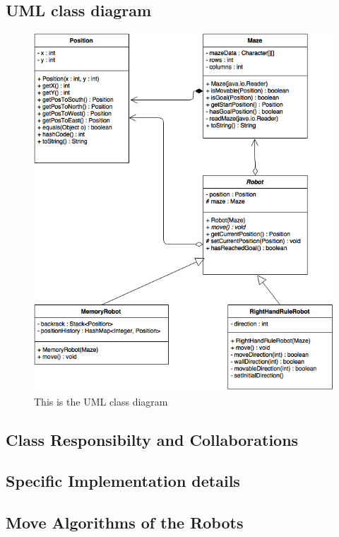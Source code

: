 \documentclass[a4paper,11pt,twoside]{article}
\begin{document}
\subsection{UML class diagram}
\begin{figure}
\centering
\includegraphics[width=\textwidth]{maze.png}
\caption{This is the UML class diagram}
\label{fig:UML}
\end{figure}

\subsection{Class Responsibilty and Collaborations}
\subsection{Specific Implementation details}

\subsection{Move Algorithms of the Robots}
\end{document}

